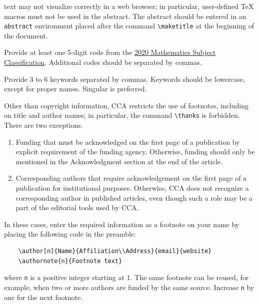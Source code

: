 \documentclass[12pt]{article}
\begin{document}
\begin{description}
  text may not visualize correctly in a web browser; in particular,
  user-defined TeX macros must not be used in the abstract.  The
  abstract should be entered in an \verb|abstract| environment placed
  after the command \verb|\maketitle| at the beginning of the
  document.
\item[Subject Classifications:] Provide at least one 5-digit code from
  the
  \href{https://mathscinet.ams.org/mathscinet/msc/msc2020.html}{2020
    Mathematics Subject Classification}.  Additional codes should be
  separated by commas.
\item[Keywords:] Provide 3 to 6 keywords separated by commas. Keywords
  should be lowercase, except for proper names. Singular is preferred.
\end{description}

\begin{note}\label{footnotes}
  Other than copyright information, CCA restricts the use of
  footnotes, including on title and author names; in particular, the
  command \verb|\thanks| is forbidden. There are two exceptions.
  \begin{enumerate}
  \item Funding that must be acknowledged on the first page of a
    publication by explicit requirement of the funding
    agency. Otherwise, funding should only be mentioned in the
    Acknowledgment section at the end of the article.
  \item Corresponding authors that require acknowledgement on the
    first page of a publication for institutional purposes. Otherwise,
    CCA does not recognize a corresponding author in published
    articles, even though such a role may be a part of the editorial
    tools used by CCA.
  \end{enumerate}
  In these cases, enter the required information as a footnote on your
  name by placing the following code in the preamble:
    \begin{verbatim}
    \author[n]{Name}{Affiliation\\Address}{email}{website}
    \authornote{n}{Footnote text}\end{verbatim}
  where \verb|n| is a positive integer starting at 1.
  The same footnote can be reused, for example,
  when two or more authors are funded by the same source.
  Increase \verb|n| by one for the next footnote.
\end{note}
\end{document}
